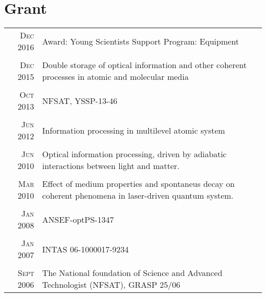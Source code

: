 \documentclass[a4paper,10pt]{article}
\begin{document}
\section{Grant}
\begin{tabular}{rl}	
	\textsc{Dec} 2016 & Award: Young Scientists Support Program: Equipment
	\\&\\
	\textsc{Dec} 2015 & Double storage of optical information and other coherent processes in atomic and molecular media
	\\&\\
	\textsc{Oct} 2013&  NFSAT, YSSP-13-46
	\\&\\
	\textsc{Jun} 2012& Information processing in multilevel atomic system
	\\&\\
	\textsc{Jun} 2010& Optical information processing, driven by adiabatic interactions between light and matter.
	\\&\\
	\textsc{Mar} 2010& Effect of medium properties and spontaneus decay on coherent phenomena in laser-driven quantum system.
	\\&\\
	\textsc{Jan} 2008& ANSEF-optPS-1347
	\\&\\
	\textsc{Jan} 2007& INTAS 06-1000017-9234
	\\&\\
	\textsc{Sept} 2006& The National foundation of Science and Advanced Technologist (NFSAT), GRASP 25/06
\end{tabular}




\newpage
\end{document}
